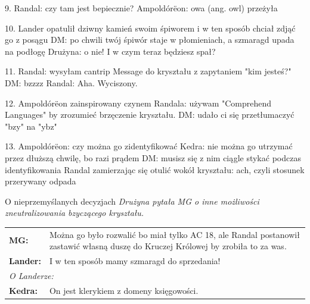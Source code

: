 \documentclass[10pt,twoside,twocolumn]{book}
\begin{document}
9. Randal: czy tam jest bepiecznie?
Ampoldórëon: owa (ang. owl) przeżyła

10. Lander opatulił dziwny kamień swoim śpiworem i w ten sposób chciał zdjąć go z posągu
DM: po chwili twój śpiwór staje w płomieniach, a szmaragd upada na podłogę
Drużyna: o nie! I w czym teraz będziesz spał?

11. Randal: wysyłam cantrip Message do kryształu z zapytaniem "kim jesteś?"
DM: bzzzz
Randal: Aha. Wyciszony.

12. Ampoldórëon zainspirowany czynem Randala: używam "Comprehend Languages" by zrozumieć brzęczenie kryształu.
DM: udało ci się przetłumaczyć "bzy" na "ybz"

13. Ampoldórëon: czy można go zidentyfikować
Kedra: nie można go utrzymać przez dłuższą chwilę, bo razi prądem
DM: musisz się z nim ciągle stykać podczas  identyfikowania
Randal zamierzając się otulić wokół kryształu: ach, czyli stosunek przerywany odpada

\begin{rpg-quotebox}{O nieprzemyślanych decyzjach}
   \textit{Drużyna pytała MG o inne możliwości zneutralizowania bzyczącego kryształu.}\\

   \begin{tabularx}{\columnwidth}{lX}
      \textbf{MG:} & Można go było rozwalić bo miał tylko AC 18, ale Randal postanowił zastawić własną duszę do Kruczej Królowej by zrobiła to za was.\\
      \textbf{Lander:} & I w ten sposób mamy szmaragd do sprzedania!\\
      \multicolumn{2}{l}{\textit{O Landerze:}}\\
      \textbf{Kedra:} &  On jest klerykiem z domeny księgowości.\\
   \end{tabularx}
\end{rpg-quotebox}
\end{document}
